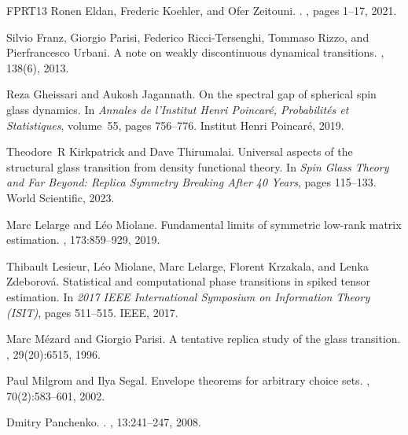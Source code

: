 \documentclass[11pt]{article}
\theoremstyle{definition}
\numberwithin{equation}{section}
\newcommand{\<}{\langle}
\renewcommand{\>}{\rangle}
\begin{document}
\begin{thebibliography}{FPRT{\etalchar{+}}13}
Ronen Eldan, Frederic Koehler, and Ofer Zeitouni.
.
, pages 1--17, 2021.

Silvio Franz, Giorgio Parisi, Federico Ricci-Tersenghi, Tommaso Rizzo, and
  Pierfrancesco Urbani.
\newblock A note on weakly discontinuous dynamical transitions.
, 138(6), 2013.

Reza Gheissari and Aukosh Jagannath.
\newblock On the spectral gap of spherical spin glass dynamics.
\newblock In {\em Annales de l'Institut Henri Poincar{\'e}, Probabilit{\'e}s et
  Statistiques}, volume~55, pages 756--776. Institut Henri Poincar{\'e}, 2019.

Theodore~R Kirkpatrick and Dave Thirumalai.
\newblock Universal aspects of the structural glass transition from density
  functional theory.
\newblock In {\em Spin Glass Theory and Far Beyond: Replica Symmetry Breaking
  After 40 Years}, pages 115--133. World Scientific, 2023.

Marc Lelarge and L{\'e}o Miolane.
\newblock Fundamental limits of symmetric low-rank matrix estimation.
, 173:859--929, 2019.

Thibault Lesieur, L{\'e}o Miolane, Marc Lelarge, Florent Krzakala, and Lenka
  Zdeborov{\'a}.
\newblock Statistical and computational phase transitions in spiked tensor
  estimation.
\newblock In {\em 2017 IEEE International Symposium on Information Theory
  (ISIT)}, pages 511--515. IEEE, 2017.

Marc M{\'e}zard and Giorgio Parisi.
\newblock A tentative replica study of the glass transition.
, 29(20):6515,
  1996.

Paul Milgrom and Ilya Segal.
\newblock Envelope theorems for arbitrary choice sets.
, 70(2):583--601, 2002.

Dmitry Panchenko.
.
, 13:241--247, 2008.


\end{thebibliography}
\end{document}
